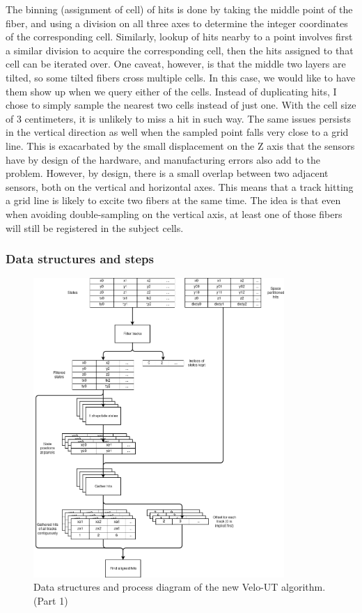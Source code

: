 \documentclass[12pt]{article}
\begin{document}
The binning (assignment of cell) of hits is done by taking the middle point of the fiber, and using a division on all three axes to determine the integer coordinates of the corresponding cell.
Similarly, lookup of hits nearby to a point involves first a similar division to acquire the corresponding cell, then the hits assigned to that cell can be iterated over. One caveat, however, is that the middle two layers are tilted, so some tilted fibers cross multiple cells. In this case, we would like to have them show up when we query either of the cells. Instead of duplicating hits, I chose to simply sample the nearest two cells instead of just one. With the cell size of 3 centimeters, it is unlikely to miss a hit in such way. The same issues persists in the vertical direction as well when the sampled point falls very close to a grid line. This is exacarbated by the small displacement on the Z axis that the sensors have by design of the hardware, and manufacturing errors also add to the problem. However, by design, there is a small overlap between two adjacent sensors, both on the vertical and horizontal axes. This means that a track hitting a grid line is likely to excite two fibers at the same time. The idea is that even when avoiding double-sampling on the vertical axis, at least one of those fibers will still be registered in the subject cells.


\subsubsection{Data structures and steps}

\begin{figure}[H]
	\begin{center}
		\includegraphics[width=0.85\textwidth]{velout_opt_datastruct_flow_p1}
	\end{center}
	\caption{Data structures and process diagram of the new Velo-UT algorithm. (Part 1)}
	\label{fig_velout_opt_datastruct_flow_p1}
\end{figure}
\end{document}

